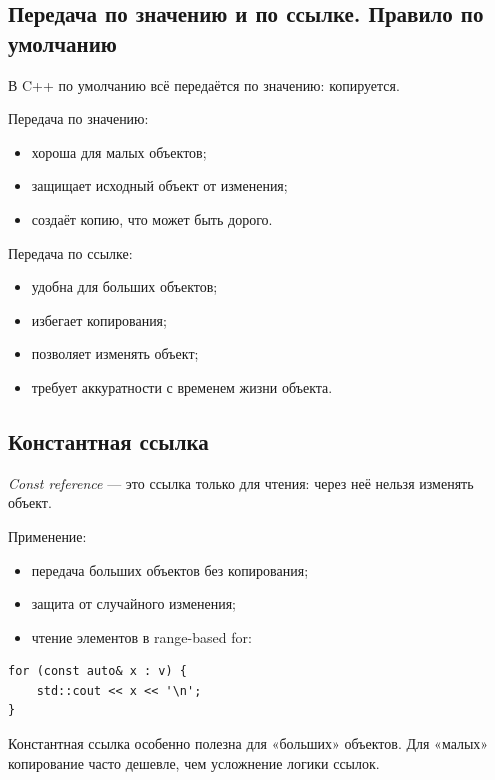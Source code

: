 \subsection{Передача по значению и по ссылке. Правило по умолчанию}
\begin{remark}
В C++ по умолчанию всё передаётся по значению: копируется.
\end{remark}

Передача по значению:
\begin{itemize}
    \item хороша для малых объектов;
    \item защищает исходный объект от изменения;
    \item создаёт копию, что может быть дорого.
\end{itemize}

Передача по ссылке:
\begin{itemize}
    \item удобна для больших объектов;
    \item избегает копирования;
    \item позволяет изменять объект;
    \item требует аккуратности с временем жизни объекта.
\end{itemize}

\subsection{Константная ссылка}
\begin{definition}
\textit{Const reference} — это ссылка только для чтения: через неё нельзя изменять объект.
\end{definition}

Применение:
\begin{itemize}
    \item передача больших объектов без копирования;
    \item защита от случайного изменения;
    \item чтение элементов в range-based for:
\end{itemize}

\begin{example}
\begin{verbatim}
for (const auto& x : v) {
    std::cout << x << '\n';
}
\end{verbatim}
\end{example}

\begin{remark}
Константная ссылка особенно полезна для «больших» объектов. Для «малых» копирование часто дешевле, чем усложнение логики ссылок.
\end{remark}

